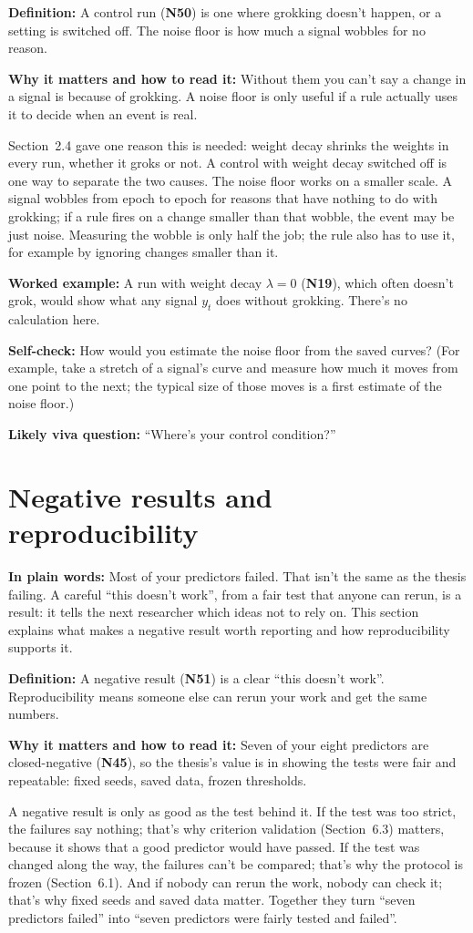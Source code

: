 \documentclass[11pt,a4paper,oneside,openany]{report}
\newcommand{\gl}[1]{\textbf{#1}}   %
\newcommand{\fplain}{\textbf{In plain words:} }
\newcommand{\fdef}{\textbf{Definition:} }
\newcommand{\fread}{\par\textbf{Why it matters and how to read it:} }
\newcommand{\fex}{\par\textbf{Worked example:} }
\newcommand{\fself}{\par\textbf{Self-check:} }
\newcommand{\fviva}{\par\textbf{Likely viva question:} }
\begin{document}
\fdef A control run (\gl{N50}) is one where grokking doesn't happen, or a setting is switched off. The noise floor is how much a signal wobbles for no reason.
\fread Without them you can't say a change in a signal is because of grokking. A noise floor is only useful if a rule actually uses it to decide when an event is real.

Section~2.4 gave one reason this is needed: weight decay shrinks the weights in every run, whether it groks or not. A control with weight decay switched off is one way to separate the two causes. The noise floor works on a smaller scale. A signal wobbles from epoch to epoch for reasons that have nothing to do with grokking; if a rule fires on a change smaller than that wobble, the event may be just noise. Measuring the wobble is only half the job; the rule also has to use it, for example by ignoring changes smaller than it.

\fex A run with weight decay $\lambda = 0$ (\gl{N19}), which often doesn't grok, would show what any signal $y_t$ does without grokking. There's no calculation here.

\fself How would you estimate the noise floor from the saved curves? (For example, take a stretch of a signal's curve and measure how much it moves from one point to the next; the typical size of those moves is a first estimate of the noise floor.)
\fviva ``Where's your control condition?''

\section{Negative results and reproducibility}
\fplain Most of your predictors failed. That isn't the same as the thesis failing. A careful ``this doesn't work'', from a fair test that anyone can rerun, is a result: it tells the next researcher which ideas not to rely on. This section explains what makes a negative result worth reporting and how reproducibility supports it.

\fdef A negative result (\gl{N51}) is a clear ``this doesn't work''. Reproducibility means someone else can rerun your work and get the same numbers.
\fread Seven of your eight predictors are closed-negative (\gl{N45}), so the thesis's value is in showing the tests were fair and repeatable: fixed seeds, saved data, frozen thresholds.

A negative result is only as good as the test behind it. If the test was too strict, the failures say nothing; that's why criterion validation (Section~6.3) matters, because it shows that a good predictor would have passed. If the test was changed along the way, the failures can't be compared; that's why the protocol is frozen (Section~6.1). And if nobody can rerun the work, nobody can check it; that's why fixed seeds and saved data matter. Together they turn ``seven predictors failed'' into ``seven predictors were fairly tested and failed''.
\end{document}
